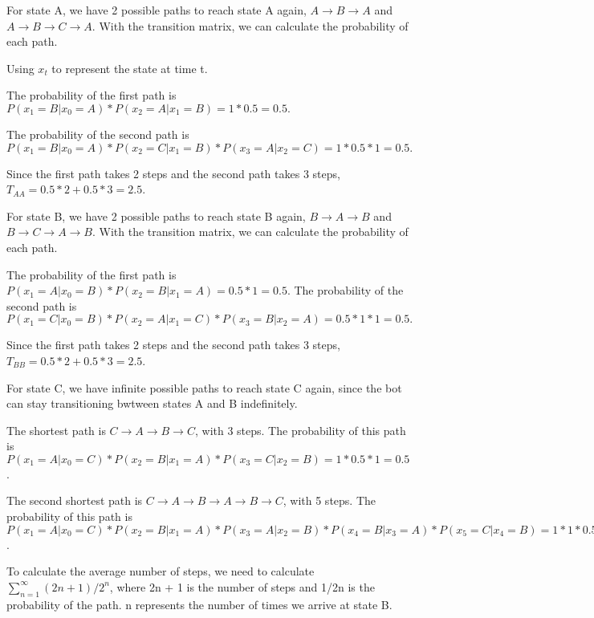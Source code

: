 \documentclass{article}
\begin{document}
For state A, we have 2 possible paths to reach state A again, $A \rightarrow B \rightarrow A$ and 
$A \rightarrow B \rightarrow C \rightarrow A$. With the transition matrix, we can calculate the probability of each path.

\bigskip

Using $x_t$ to represent the state at time t. 

The probability of the first path is $P(x_1=B|x_0=A) * P(x_2=A|x_1=B) = 1 * 0.5 = 0.5.$

The probability of the second path is $P(x_1=B|x_0=A) * P(x_2=C|x_1=B) * P(x_3=A|x_2=C) = 1 * 0.5 * 1 = 0.5.$


Since the first path takes 2 steps and the second path takes 3 steps, 
$T_{AA} = 0.5 * 2 + 0.5 * 3 = 2.5$.

\bigskip

For state B, we have 2 possible paths to reach state B again, $B \rightarrow A \rightarrow B$ and
$B \rightarrow C \rightarrow A \rightarrow B$. With the transition matrix, we can calculate the probability of each path.

The probability of the first path is $P(x_1=A|x_0=B) * P(x_2=B|x_1=A) = 0.5 * 1 = 0.5.$
The probability of the second path is $P(x_1=C|x_0=B) * P(x_2=A|x_1=C) * P(x_3=B|x_2=A) = 0.5 * 1 * 1 = 0.5.$

Since the first path takes 2 steps and the second path takes 3 steps,
$T_{BB} = 0.5 * 2 + 0.5 * 3 = 2.5$.

\bigskip

For state C, we have infinite possible paths to reach state C again, since the bot can stay transitioning bwtween states A and B indefinitely.

The shortest path is $C \rightarrow A \rightarrow B \rightarrow C$, with 3 steps.
The probability of this path is $P(x_1=A|x_0=C) * P(x_2=B|x_1=A) * P(x_3=C|x_2=B) = 1 * 0.5 * 1 = 0.5$.

The second shortest path is $C \rightarrow A \rightarrow B \rightarrow A \rightarrow B \rightarrow C$, with 5 steps.
The probability of this path is $P(x_1=A|x_0=C) * P(x_2=B|x_1=A) * P(x_3=A|x_2=B) * P(x_4=B|x_3=A) * P(x_5=C|x_4=B) 
= 1 * 1 * 0.5 * 1 * 0.5 = 0.25$.


To calculate the average number of steps, we need to calculate $\sum_{n=1}^{\infty} (2n + 1) / 2^n$, 
where 2n + 1 is the number of steps and 1/2n is the probability of the path. n represents the number of times we arrive at 
state B.

\bigskip
\end{document}
